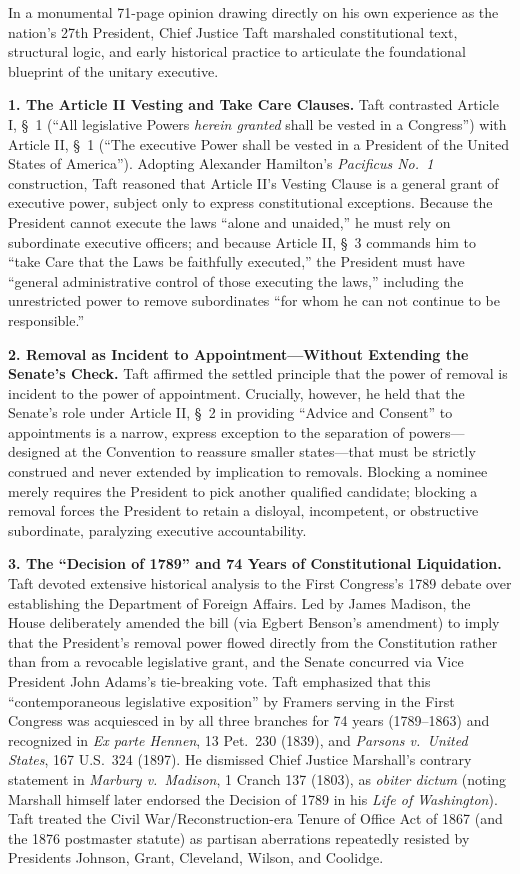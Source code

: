 \documentclass[12pt]{article}
\begin{document}
In a monumental 71-page opinion drawing directly on his own experience as the nation's 27th President, Chief Justice Taft marshaled constitutional text, structural logic, and early historical practice to articulate the foundational blueprint of the unitary executive.

\textbf{1. The Article II Vesting and Take Care Clauses.}
Taft contrasted Article I, \S~1 (``All legislative Powers \emph{herein granted} shall be vested in a Congress'') with Article II, \S~1 (``The executive Power shall be vested in a President of the United States of America''). Adopting Alexander Hamilton's \textit{Pacificus No.\ 1} construction, Taft reasoned that Article II's Vesting Clause is a general grant of executive power, subject only to express constitutional exceptions. Because the President cannot execute the laws ``alone and unaided,'' he must rely on subordinate executive officers; and because Article II, \S~3 commands him to ``take Care that the Laws be faithfully executed,'' the President must have ``general administrative control of those executing the laws,'' including the unrestricted power to remove subordinates ``for whom he can not continue to be responsible.''

\textbf{2. Removal as Incident to Appointment---Without Extending the Senate's Check.}
Taft affirmed the settled principle that the power of removal is incident to the power of appointment. Crucially, however, he held that the Senate's role under Article II, \S~2 in providing ``Advice and Consent'' to appointments is a narrow, express exception to the separation of powers---designed at the Convention to reassure smaller states---that must be strictly construed and never extended by implication to removals. Blocking a nominee merely requires the President to pick another qualified candidate; blocking a removal forces the President to retain a disloyal, incompetent, or obstructive subordinate, paralyzing executive accountability.

\textbf{3. The ``Decision of 1789'' and 74 Years of Constitutional Liquidation.}
Taft devoted extensive historical analysis to the First Congress's 1789 debate over establishing the Department of Foreign Affairs. Led by James Madison, the House deliberately amended the bill (via Egbert Benson's amendment) to imply that the President's removal power flowed directly from the Constitution rather than from a revocable legislative grant, and the Senate concurred via Vice President John Adams's tie-breaking vote. Taft emphasized that this ``contemporaneous legislative exposition'' by Framers serving in the First Congress was acquiesced in by all three branches for 74 years (1789--1863) and recognized in \textit{Ex parte Hennen}, 13 Pet.\ 230 (1839), and \textit{Parsons v.\ United States}, 167 U.S.\ 324 (1897). He dismissed Chief Justice Marshall's contrary statement in \textit{Marbury v.\ Madison}, 1 Cranch 137 (1803), as \textit{obiter dictum} (noting Marshall himself later endorsed the Decision of 1789 in his \textit{Life of Washington}). Taft treated the Civil War/Reconstruction-era Tenure of Office Act of 1867 (and the 1876 postmaster statute) as partisan aberrations repeatedly resisted by Presidents Johnson, Grant, Cleveland, Wilson, and Coolidge.
\end{document}
